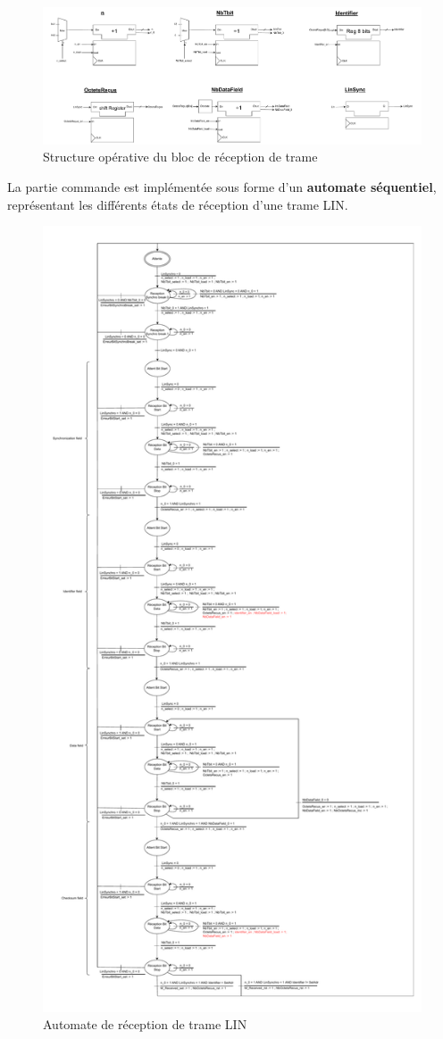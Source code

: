 \begin{figure}[H]
    \centering
    \includegraphics[width=0.95\linewidth]{images/inter/Structure_Reception_trame.pdf}
    \caption{Structure opérative du bloc de réception de trame}
    \label{fig:reception_structure}
\end{figure}

La partie commande est implémentée sous forme d’un \textbf{automate séquentiel}, représentant les différents états de réception d’une trame LIN.

\begin{figure}[H]
    \centering
    \includegraphics[width=0.6\linewidth]{images/inter/Automate_Reception_trame.pdf}
    \caption{Automate de réception de trame LIN}
    \label{fig:automate_reception}
\end{figure}

